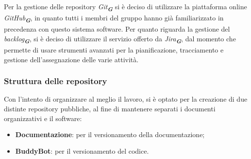 Per la gestione delle repository \emph{Git}\textsubscript{\textit{\textbf{G}}} si è deciso di utilizzare la 
piattaforma online \emph{GitHub}\textsubscript{\textit{\textbf{G}}}, in
quanto tutti i membri del gruppo hanno già familiarizzato in precedenza con questo sistema
software. Per quanto riguarda la gestione del \emph{backlog}\textsubscript{\textit{\textbf{G}}}, si è deciso di utilizzare
il servizio offerto da \emph{Jira}\textsubscript{\textit{\textbf{G}}}, dal momento che permette di usare strumenti avanzati per la
pianificazione, tracciamento e gestione dell’assegnazione delle varie attività.


\subsubsection{Struttura delle repository}
Con l’intento di organizzare al meglio il lavoro, si è optato per la creazione di due distinte 
repository pubbliche, al fine di mantenere separati i documenti organizzativi e il software:
\begin{itemize}
    \item \textbf{Documentazione}: per il versionamento della documentazione;
    \item \textbf{BuddyBot}: per il versionamento del codice.
\end{itemize}

